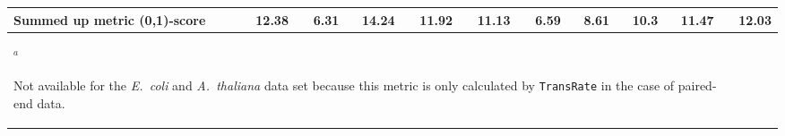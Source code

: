\documentclass{scrartcl}
\begin{document}
\begin{landscape}
\begin{table}
\begin{scriptsize}
\begin{tabular}{llllllllllll}
\multicolumn{2}{l}{\textbf{Summed up metric (0,1)-score}}&12.38&6.31&14.24&11.92&11.13&6.59&8.61&10.3&11.47&12.03\\\bottomrule
\multicolumn{11}{l}{$^{a}$\begin{scriptsize}Not available for the \emph{E.~coli} and \emph{A.~thaliana} data set because this metric is only calculated by \texttt{TransRate} in the case of paired-end data.\end{scriptsize}}\\\end{tabular}\end{scriptsize}
\end{table}
\end{landscape}
\end{document}
